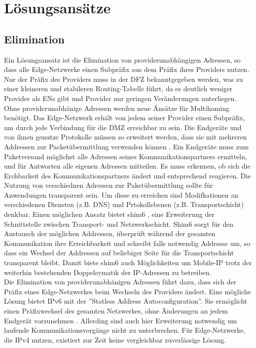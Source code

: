 \section{Lösungsansätze}
\subsection{Elimination}
Ein Lösungsansatz ist die Elimination von providerunabhängigen Adressen, so dass alle Edge-Netzwerke einen Subpräfix aus dem Präfix ihres Providers nutzen. Nur der Präfix des Providers muss in der DFZ bekanntgegeben werden, was zu einer kleineren und stabileren Routing-Tabelle führt, da es deutlich weniger Provider als ENs gibt und Provider nur geringen Veränderungen unterliegen.\\

Ohne providerunabhänige Adressen werden neue Änsätze für Multihoming benötigt. Das Edge-Netzwerk erhält von jedem seiner Provider einen Subpräfix, um durch jede Verbindung für die DMZ erreichbar zu sein. Die Endgeräte und von ihnen genutze Protokolle müssen so erweitert werden, dass sie mit mehreren Addressen zur Packetübermittlung verwenden können \cite{jen:2008:start}. Ein Endgeräte muss zum Paketversand möglichst alle Adressen seines Kommunikationspartners ermitteln, und für Antworten alle eigenen Adressen mitteilen. Es muss erkennen, ob sich die Erchbarkeit des Kommunikationspartners ändert und entsprechend reagieren. Die Nutzung von verschiednen Adressen zur Paketübermittlung sollte für Anwendungen transparent sein. Um diese zu erreichen sind Modifkationen an verschiedenen Diensten (z.B. DNS) und Prtokollebenen (z.B. Transportschicht) denkbar. Einen möglichen Ansatz bietet shim6 \cite{nordmark:2009:RFC5533}, eine Erweiterung der Schnittstelle zwischen Transport- und Netzwerkschicht. Shim6 sorgt für den Austausch der möglichen Addressen, überprüft während der gesamten Kommunikation ihre Erreichbarkeit und schreibt falls notwendig Addresse um, so dass ein Wechsel der Addressen auf beliebiger Seite für die Transportschicht transparent bleibt. Damit biete shim6 auch Möglichkeiten um Mobile-IP trotz der weiterhin bestehenden Doppelsymatik der IP-Adressen zu betreiben. \\
 
Die Elimination von providerunabhänigen Adressen führt dazu, dass sich der Präfix eines Edge-Netzwerkes beim Wechseln des Providers ändert. Eine mögliche Lösung bietet IPv6 mit der ''Statless Address Autoconfiguration''. Sie ermöglicht einen Präfixwechsel des gesamten Netzwerkes, ohne Änderungen an jedem Endgerät vorzunehmen \cite{RFC4862}. Allerding sind auch hier Erweiterung notwendig um laufende Kommunikationsvorgänge nicht zu unterbrechen. Für Edge-Netzwerke, die IPv4 nutzen, existiert zur Zeit keine vergleichbar zuverlässige Lösung.\\

